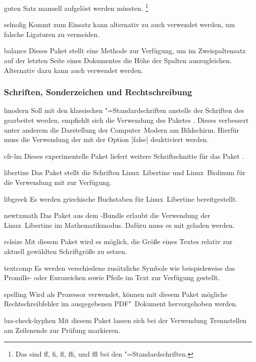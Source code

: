 \documentclass[%
  english,ngerman,%
  headings=optiontoheadandtoc,captions=tableheading,numbers=noenddot,%
  chapterpage,cdfoot,%
]{tudscrman}
\begin{document}
\begin{packages}
  guten Satz manuell aufgelöst werden müssten.%
  \footnote{%
    Das sind ff, fi, fl, ffi, und ffl bei den "=Standardschriften.
  }
\item[selnolig]
  Kommt  zum Einsatz kann alternativ zu  
  auch  verwendet werden, um falsche Ligaturen zu vermeiden.
\item[balance]
  Dieses Paket stellt eine Methode zur Verfügung, um im Zweispaltensatz auf der 
  letzten Seite eines Dokumentes die Höhe der Spalten auszugleichen. Alternativ 
  dazu kann auch  verwendet werden.
\end{packages}

\subsubsection{Schriften, Sonderzeichen und Rechtschreibung}
\begin{packages}
\item[lmodern]
  Soll mit den klassischen "=Standardschriften anstelle der 
  Schriften des \CDs gearbeitet werden, empfiehlt sich die Verwendung des 
  Paketes . Dieses verbessert unter anderem die Darstellung 
  der Computer~Modern am Bildschirm. Hierfür muss die Verwendung der \Univers 
  mit der Option [false] deaktiviert werden.
\item[cfr-lm]
  Dieses experimentelle Paket liefert weitere Schriftschnitte für das Paket 
  .
\item[libertine]
  Das Paket stellt die Schriften Linux~Libertine und Linux~Biolinum für die 
  Verwendung mit  zur Verfügung.
  \begin{packages}
    \item[libgreek]
      Es werden griechische Buchstaben für Linux~Libertine bereitgestellt.
    \item[newtxmath]
      Das Paket aus dem -Bundle erlaubt die Verwendung der 
      Linux~Libertine im Mathematikmodus. Dafüru muss es mit
       geladen 
      werden.
  \end{packages}
\item[relsize]
  Mit diesem Paket wird es möglich, die Größe eines Textes relativ zur aktuell 
  gewählten Schriftgröße zu setzen.
\item[textcomp]
  Es werden verschiedene zusätzliche Symbole wie beispielsweise das Promille- 
  oder Eurozeichen sowie Pfeile im Text zur Verfügung gestellt.
\item[spelling]
  Wird  als Prozessor verwendet, können mit diesem Paket 
  mögliche Rechtschreibfehler im ausgegebenen PDF"~Dokument hervorgehoben werden.
\item[lua-check-hyphen]
  Mit diesem Paket lassen sich bei der Verwendung  Trennstellen 
  am  Zeilenende zur Prüfung markieren.
\end{packages}
\end{document}
